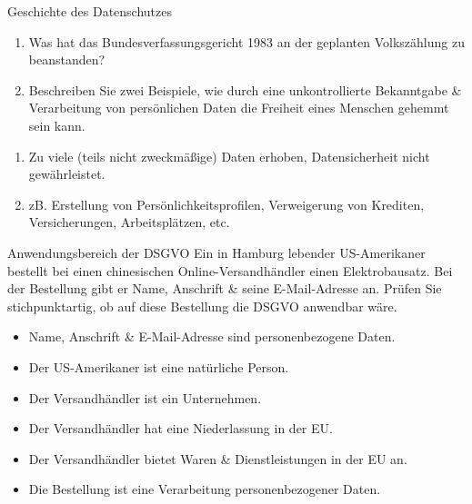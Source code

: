 \documentclass{article}
\author{Leopold Lemmermann}
\begin{document}
\createtitle

\begin{exercise}{Geschichte des Datenschutzes}
  \begin{enumerate}
    \item Was hat das Bundesverfassungsgericht 1983 an der geplanten Volkszählung zu beanstanden?
    \item Beschreiben Sie zwei Beispiele, wie durch eine unkontrollierte Bekanntgabe \& Verarbeitung von persönlichen Daten die Freiheit eines Menschen gehemmt sein kann.
  \end{enumerate}

  \begin{solution}
    \begin{enumerate}
      \item Zu viele (teils nicht zweckmäßige) Daten erhoben, Datensicherheit nicht gewährleistet.
      \item zB. Erstellung von Persönlichkeitsprofilen, Verweigerung von Krediten, Versicherungen, Arbeitsplätzen, etc.
    \end{enumerate}
  \end{solution}
\end{exercise}

\begin{exercise}{Anwendungsbereich der DSGVO}
  Ein in Hamburg lebender US-Amerikaner bestellt bei einen chinesischen Online-Versandhändler einen Elektrobausatz. Bei der Bestellung gibt er Name, Anschrift \& seine E-Mail-Adresse an. Prüfen Sie stichpunktartig, ob auf diese Bestellung die DSGVO anwendbar wäre.

  \begin{solution}
    \begin{itemize}
      \item Name, Anschrift \& E-Mail-Adresse sind personenbezogene Daten. \checkmark
      \item Der US-Amerikaner ist eine natürliche Person. \checkmark
      \item Der Versandhändler ist ein Unternehmen. \checkmark
      \item Der Versandhändler hat eine Niederlassung in der EU. \xmark
      \item Der Versandhändler bietet Waren \& Dienstleistungen in der EU an. \checkmark
      \item Die Bestellung ist eine Verarbeitung personenbezogener Daten. \checkmark
    \end{itemize}
  \end{solution}
\end{exercise}
\end{document}
